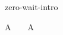 \begin{circustimelaw}{zero-wait-intro}
\begin{circusaction*}
  A ~ \equiv ~  \circseq A
\end{circusaction*}
\end{circustimelaw}
